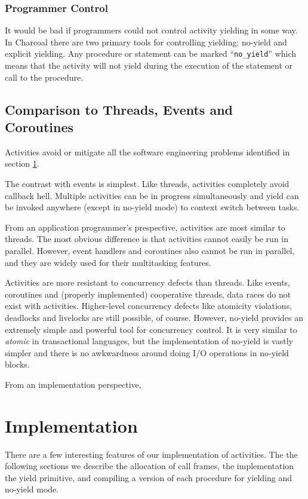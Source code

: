 \documentclass[10pt,preprint]{sigplanconf}
\begin{document}
\subsubsection{Programmer Control}

It would be bad if programmers could not control activity yielding in some way.
In Charcoal there are two primary tools for controlling yielding: no-yield and explicit yielding.
Any procedure or statement can be marked ``\texttt{no\_yield}'' which means that the activity will not yield during the execution of the statement or call to the procedure.

\subsection{Comparison to Threads, Events and Coroutines}

Activities avoid or mitigate all the software engineering problems identified in section \ref{}.

The contrast with events is simplest.
Like threads, activities completely avoid callback hell.
Multiple activities can be in progress simultaneously and yield can be invoked anywhere (except in no-yield mode) to context switch between tasks.

From an application programmer's prespective, activities are most similar to threads.
The most obvious difference is that activities cannot easily be run in parallel.
However, event handlers and coroutines also cannot be run in parallel, and they are widely used for their multitasking features.

Activities are more resistant to concurrency defects than threads.
Like events, coroutines and (properly implemented) cooperative threads, data races do not exist with activities.
Higher-level concurrency defects like atomicity violations, deadlocks and livelocks are still possible, of course.
However, no-yield provides an extremely simple and powerful tool for concurrency control.
It is very similar to \emph{atomic} in transactional languages, but the implementation of no-yield is vastly simpler and there is no awkwardness around doing I/O operations in no-yield blocks.

From an implementation perspective, 

\section{Implementation}

There are a few interesting features of our implementation of activities.
The the following sections we describe the allocation of call frames, the implementation the yield primitive, and compiling a version of each procedure for yielding and no-yield mode.
\end{document}
